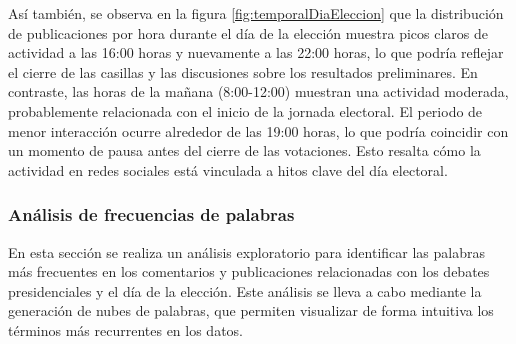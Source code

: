 \documentclass[10pt, a4paper]{article}
\begin{document}
	Así también, se observa en la figura \ref{fig:temporalDiaEleccion} que la distribución de publicaciones por hora durante el día de la elección muestra picos claros de actividad a las 16:00 horas y nuevamente a las 22:00 horas, lo que podría reflejar el cierre de las casillas y las discusiones sobre los resultados preliminares. En contraste, las horas de la mañana (8:00-12:00) muestran una actividad moderada, probablemente relacionada con el inicio de la jornada electoral. El periodo de menor interacción ocurre alrededor de las 19:00 horas, lo que podría coincidir con un momento de pausa antes del cierre de las votaciones. Esto resalta cómo la actividad en redes sociales está vinculada a hitos clave del día electoral.
	
	
	\subsubsection{Análisis de frecuencias de palabras}
	
	En esta sección se realiza un análisis exploratorio para identificar las palabras más frecuentes en los comentarios y publicaciones relacionadas con los debates presidenciales y el día de la elección. Este análisis se lleva a cabo mediante la generación de nubes de palabras, que permiten visualizar de forma intuitiva los términos más recurrentes en los datos.
	
\end{document}
